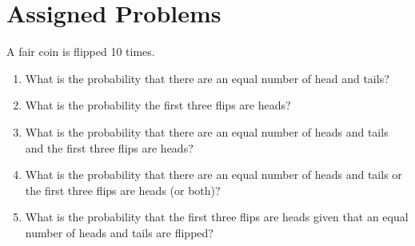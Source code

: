 \documentclass{article}
\theoremstyle{definition}
\begin{document}
\section*{Assigned Problems}
\begin{question}
        A fair coin is flipped 10 times.
    \begin{enumerate}
        \item What is the probability that there are an equal number of head and
            tails?
        \item What is the probability the first three flips are heads?
        \item What is the probability that there are an equal number of heads
            and tails and the first three flips are heads?
        \item What is the probability that there are an equal number of heads
            and tails or the first three flips are heads (or both)?
        \item What is the probability that the first three flips are heads given
            that an equal number of heads and tails are flipped?
    \end{enumerate}
\end{question}
\end{document}
